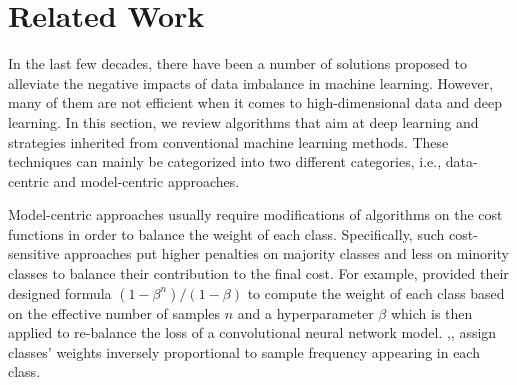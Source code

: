 
\section{Related Work}
\label{sec:relatedwork}
In the last few decades, there have been a number of solutions proposed to alleviate the negative impacts of data imbalance in machine learning. However, many of them are not efficient when it comes to high-dimensional data and deep learning. In this section, we review algorithms that aim at deep learning and strategies inherited from conventional machine learning methods. These techniques can mainly be categorized into two different categories, i.e., data-centric and model-centric approaches. 


Model-centric approaches usually require modifications of algorithms on the cost functions in order to balance the weight of each class. Specifically, such cost-sensitive approaches put higher penalties on majority classes and less on minority classes to balance their contribution to the final cost. For example,  \cite{cui_class-balanced_2019} provided their designed formula $ (1 - \beta^n)/(1 - \beta)$ to compute the weight of each class based on the effective number of samples $n$ and a hyperparameter $\beta$ which is then applied to re-balance the loss of a convolutional neural network model.  \cite{huang_learning_2016},\cite{rangarajan_sridhar_unsupervised_2015}, \cite{DBLP:journals/corr/abs-1805-00932} assign classes' weights inversely proportional to sample frequency appearing in each class.      


